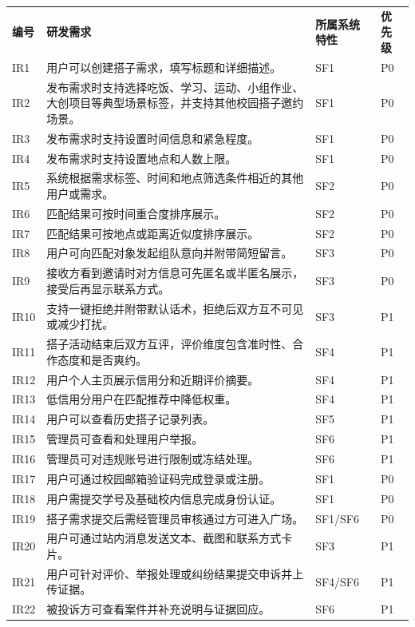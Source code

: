 {\def\LTcaptype{none} %
\begin{xltabular}{\textwidth}{@{}>{\centering\arraybackslash}X>{\centering\arraybackslash}X>{\centering\arraybackslash}X>{\centering\arraybackslash}X@{}}
\toprule\noalign{}
\endhead
\bottomrule\noalign{}
\endlastfoot
\textbf{编号} & \textbf{研发需求} & \textbf{所属系统特性} &
\textbf{优先级} \\
IR1 & 用户可以创建搭子需求，填写标题和详细描述。 & SF1 & P0 \\
IR2 &
发布需求时支持选择吃饭、学习、运动、小组作业、大创项目等典型场景标签，并支持其他校园搭子邀约场景。
& SF1 & P0 \\
IR3 & 发布需求时支持设置时间信息和紧急程度。 & SF1 & P0 \\
IR4 & 发布需求时支持设置地点和人数上限。 & SF1 & P0 \\
IR5 & 系统根据需求标签、时间和地点筛选条件相近的其他用户或需求。 & SF2 &
P0 \\
IR6 & 匹配结果可按时间重合度排序展示。 & SF2 & P0 \\
IR7 & 匹配结果可按地点或距离近似度排序展示。 & SF2 & P0 \\
IR8 & 用户可向匹配对象发起组队意向并附带简短留言。 & SF3 & P0 \\
IR9 &
接收方看到邀请时对方信息可先匿名或半匿名展示，接受后再显示联系方式。 &
SF3 & P0 \\
IR10 & 支持一键拒绝并附带默认话术，拒绝后双方互不可见或减少打扰。 & SF3
& P1 \\
IR11 & 搭子活动结束后双方互评，评价维度包含准时性、合作态度和是否爽约。
& SF4 & P1 \\
IR12 & 用户个人主页展示信用分和近期评价摘要。 & SF4 & P1 \\
IR13 & 低信用分用户在匹配推荐中降低权重。 & SF4 & P1 \\
IR14 & 用户可以查看历史搭子记录列表。 & SF5 & P1 \\
IR15 & 管理员可查看和处理用户举报。 & SF6 & P1 \\
IR16 & 管理员可对违规账号进行限制或冻结处理。 & SF6 & P1 \\
IR17 & 用户可通过校园邮箱验证码完成登录或注册。 & SF1 & P0 \\
IR18 & 用户需提交学号及基础校内信息完成身份认证。 & SF1 & P0 \\
IR19 & 搭子需求提交后需经管理员审核通过方可进入广场。 & SF1/SF6 & P0 \\
IR20 & 用户可通过站内消息发送文本、截图和联系方式卡片。 & SF3 & P1 \\
IR21 & 用户可针对评价、举报处理或纠纷结果提交申诉并上传证据。 & SF4/SF6
& P1 \\
IR22 & 被投诉方可查看案件并补充说明与证据回应。 & SF6 & P1 \\
\end{xltabular}
}


